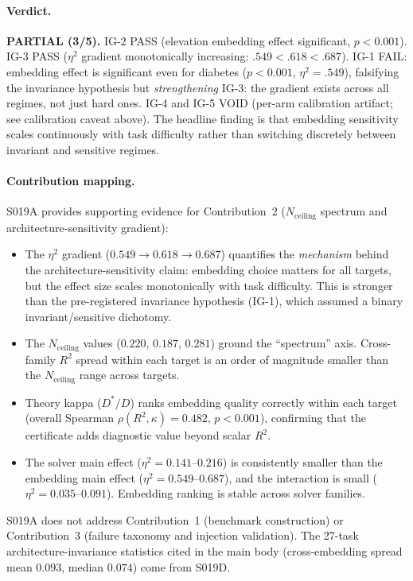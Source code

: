 \documentclass{article}
\begin{document}

\paragraph{Verdict.} \textbf{PARTIAL (3/5).} IG-2 PASS (elevation embedding effect significant, $p < 0.001$). IG-3 PASS ($\eta^2$ gradient monotonically increasing: $.549 < .618 < .687$). IG-1 FAIL: embedding effect is significant even for diabetes ($p < 0.001$, $\eta^2 = .549$), falsifying the invariance hypothesis but \emph{strengthening} IG-3: the gradient exists across all regimes, not just hard ones. IG-4 and IG-5 VOID (per-arm calibration artifact; see calibration caveat above). The headline finding is that embedding sensitivity scales continuously with task difficulty rather than switching discretely between invariant and sensitive regimes.

\paragraph{Contribution mapping.}
S019A provides supporting evidence for Contribution~2 ($N_{\text{ceiling}}$ spectrum and architecture-sensitivity gradient):
\begin{itemize}
\item The $\eta^2$ gradient ($0.549 \to 0.618 \to 0.687$) quantifies the \emph{mechanism} behind the architecture-sensitivity claim: embedding choice matters for all targets, but the effect size scales monotonically with task difficulty. This is stronger than the pre-registered invariance hypothesis (IG-1), which assumed a binary invariant/sensitive dichotomy.
\item The $N_{\text{ceiling}}$ values ($0.220$, $0.187$, $0.281$) ground the ``spectrum'' axis. Cross-family $R^2$ spread within each target is an order of magnitude smaller than the $N_{\text{ceiling}}$ range across targets.
\item Theory kappa ($D^*/D$) ranks embedding quality correctly within each target (overall Spearman $\rho(R^2, \kappa) = 0.482$, $p < 0.001$), confirming that the certificate adds diagnostic value beyond scalar $R^2$.
\item The solver main effect ($\eta^2 = 0.141$--$0.216$) is consistently smaller than the embedding main effect ($\eta^2 = 0.549$--$0.687$), and the interaction is small ($\eta^2 = 0.035$--$0.091$). Embedding ranking is stable across solver families.
\end{itemize}
S019A does not address Contribution~1 (benchmark construction) or Contribution~3 (failure taxonomy and injection validation). The 27-task architecture-invariance statistics cited in the main body (cross-embedding spread mean $0.093$, median $0.074$) come from S019D.
\end{document}

